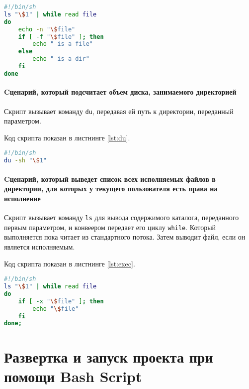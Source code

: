 \begin{lstlisting}[language=Bash
	, caption=\leftline{Вывод содержимого директории с информацией о файлах}
	, label=lst:info]
#!/bin/sh
ls "\$1" | while read file
do
	echo -n "\$file"
	if [ -f "\$file" ]; then
		echo " is a file"
	else
		echo " is a dir"
	fi
done
\end{lstlisting}

\paragraph{Cценарий, который подсчитает объем диска, занимаемого
директорией}\mbox{}\par
Скрипт вызывает команду \texttt{du}, передавая ей путь к директории,
переданный параметром.\par
Код скрипта показан в листнинге \ref{lst:du}.

\begin{lstlisting}[language=Bash
	, caption=\leftline{Вывод объема директории}
	, label=lst:du]
#!/bin/sh
du -sh "\$1"
\end{lstlisting}

\paragraph{Cценарий, который выведет список всех исполняемых
файлов в директории, для которых у текущего пользователя есть права
на исполнение}\mbox{}\par
Скрипт вызывает команду \texttt{ls} для вывода содержимого каталога,
переданного первым параметром, и конвеером передает его циклу
\texttt{while}. Который выполняется пока читает из стандартного потока.
Затем выводит файл, если он является исполняемым.\par
Код скрипта показан в листнинге \ref{lst:exec}.

\begin{lstlisting}[language=Bash
	, caption=\leftline{Проверка на директорию}
	, label=lst:exec]
#!/bin/sh
ls "\$1" | while read file
do
	if [ -x "\$file" ]; then
		echo "\$file"		
	fi
done;
\end{lstlisting}

\clearpage

\section{Развертка и запуск проекта при помощи Bash Script}

